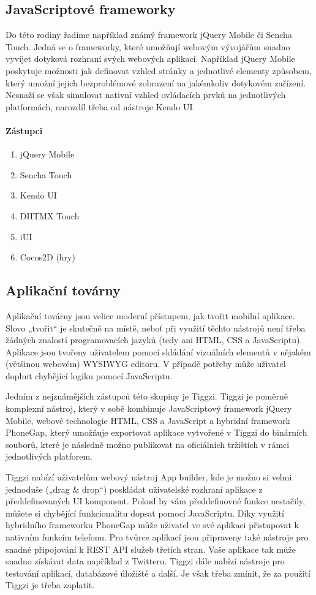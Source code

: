 \subsection{JavaScriptové frameworky}
Do této rodiny řadíme například známý framework jQuery Mobile či Sencha Touch. Jedná se o frameworky, které umožňují webovým vývojářům snadno vyvíjet dotyková rozhraní svých webových aplikací. Například jQuery Mobile poskytuje možnosti jak definovat vzhled stránky a jednotlivé elementy způsobem, který umožní jejich bezproblémové zobrazení na jakémkoliv dotykovém zařízení. Nesnaží se však simulovat nativní vzhled ovládacích prvků na jednotlivých platformách, narozdíl třeba od nástroje Kendo UI.

\paragraph{Zástupci}
\begin{enumerate}
	\item jQuery Mobile
	\item Sencha Touch
	\item Kendo UI
	\item DHTMX Touch
	\item iUI
	\item Cocos2D (hry)
\end{enumerate}

\subsection{Aplikační továrny}
Aplikační továrny jsou velice moderní přístupem, jak tvořit mobilní aplikace. Slovo „tvořit“ je skutečně na místě, neboť při využití těchto nástrojů není třeba žádných znalostí programovacích jazyků (tedy ani HTML, CSS a JavaScriptu). Aplikace jsou tvořeny uživatelem pomocí skládání vizuálních elementů v nějakém (většinou webovém) WYSIWYG editoru. V případě potřeby může uživatel doplnit chybějící logiku pomocí JavaScriptu.

Jedním z nejznámějších zástupců této skupiny je Tiggzi. Tiggzi je poměrně komplexní nástroj, který v sobě kombinuje JavaScriptový framework jQuery Mobile, webové technologie HTML, CSS a JavaScript a hybridní framework PhoneGap, který umožňuje exportovat aplikace vytvořené v Tiggzi do binárních souborů, které je následně možno publikovat na oficiálních tržištích v rámci jednotlivých platforem.

Tiggzi nabízí uživatelům webový nástroj App builder, kde je možno si velmi jednoduše („drag \& drop“) poskládat uživatelské rozhraní aplikace z předdefinovaných UI komponent. Pokud by vám předdefinovné funkce nestačily, můžete si chybějící funkcionalitu dopsat pomocí JavaScriptu. Díky využití hybridního frameworku PhoneGap může uživatel ve své aplikaci přistupovat k nativním funkcím telefonu. Pro tvůrce aplikací jsou připraveny také nástroje pro snadné připojování k REST API služeb třetích stran. Vaše aplikace tak může snadno získávat data například z Twitteru. Tiggzi dále nabízí nástroje pro testování aplikací, databázové úložiště a další. Je však třeba zmínit, že za použití Tiggzi je třeba zaplatit.

